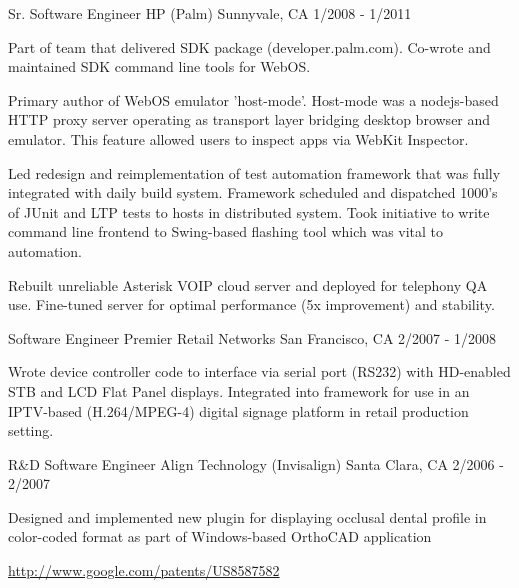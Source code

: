 \documentclass[11pt, a4paper]{awesome-cv}
\begin{document}
\begin{cventries}
  \cventry
    {Sr. Software Engineer} %
    {HP (Palm)} %
    {Sunnyvale, CA} %
    {1/2008 - 1/2011} %
    {
      \begin{cvitems} %
        \item {Part of team that delivered SDK package (developer.palm.com). Co-wrote and maintained SDK command line tools for WebOS.}
        \item {Primary author of WebOS emulator 'host-mode'. Host-mode was a nodejs-based HTTP proxy server operating as transport layer
bridging desktop browser and emulator. This feature allowed users to inspect apps via WebKit Inspector.}
        \item {Led redesign and reimplementation of test automation framework that was fully integrated with daily build system. Framework scheduled and dispatched 1000's of JUnit and LTP tests to hosts in distributed system. Took initiative to write command line frontend to Swing-based flashing tool which was vital to automation.} 
        \item {Rebuilt unreliable Asterisk VOIP cloud server and deployed for telephony QA use. Fine-tuned server for optimal performance (5x improvement) and stability.}
      \end{cvitems} 
    }

  \cventry
    {Software Engineer} %
    {Premier Retail Networks} %
    {San Francisco, CA} %
    {2/2007 - 1/2008} %
    {
      \begin{cvitems} %
        \item {Wrote device controller code to interface via serial port (RS232) with HD-enabled STB and LCD Flat Panel displays. Integrated into framework for use in an IPTV-based (H.264/MPEG-4) digital signage platform in retail production setting.}
      \end{cvitems}
    }

  \cventry
    {R\&D Software Engineer} %
    {Align Technology (Invisalign)} %
    {Santa Clara, CA} %
    {2/2006 - 2/2007} %
    {
      \begin{cvitems} %
        \item {Designed and implemented new plugin for displaying occlusal dental profile in color-coded format as part of Windows-based OrthoCAD application}
        \item {\href{http://www.google.com/patents/US8587582}{http://www.google.com/patents/US8587582}}
      \end{cvitems}
    }


\end{cventries}
\end{document}
